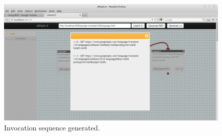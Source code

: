 \begin{figure}
        \centering
        \includegraphics[scale=0.3]{images/1.png}
        \caption{Invocation sequence generated.}
\end{figure}

